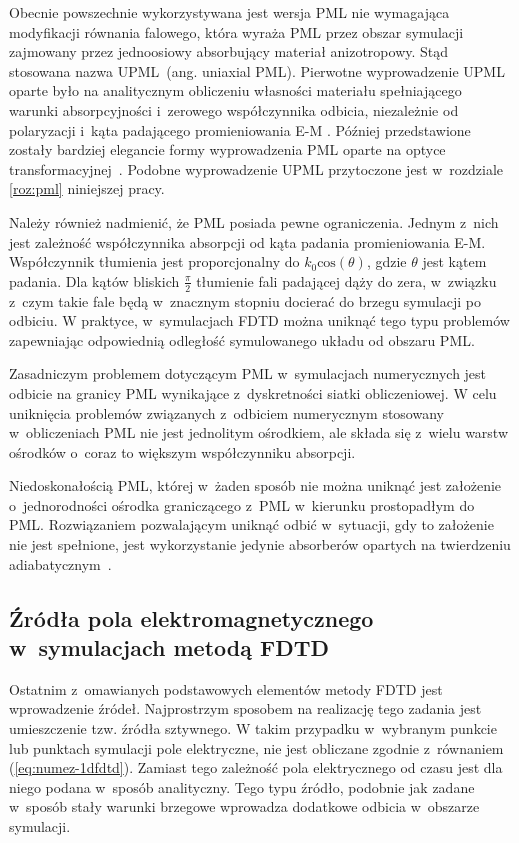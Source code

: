 Obecnie powszechnie wykorzystywana jest wersja PML nie wymagająca modyfikacji równania falowego, która wyraża PML przez obszar symulacji zajmowany przez jednoosiowy absorbujący materiał anizotropowy. Stąd stosowana nazwa UPML~(ang. uniaxial PML). Pierwotne wyprowadzenie UPML oparte było na analitycznym obliczeniu własności materiału spełniającego warunki absorpcyjności i~zerowego współczynnika odbicia, niezależnie od polaryzacji i~kąta padającego promieniowania E-M  \cite{sacks1995perfectly}. Później przedstawione zostały bardziej elegancie formy wyprowadzenia PML oparte na optyce transformacyjnej~\cite{rappaport1995perfectly}. Podobne wyprowadzenie UPML przytoczone jest w~rozdziale \ref{roz:pml} niniejszej pracy.

Należy również nadmienić, że PML posiada pewne ograniczenia. Jednym z~nich jest zależność współczynnika absorpcji od kąta padania promieniowania E-M. Współczynnik tłumienia jest proporcjonalny do $k_0 \textrm{cos}(\theta)$, gdzie $\theta$ jest kątem padania. Dla kątów bliskich $\frac{\pi}{2}$ tłumienie fali padającej dąży do zera, w~związku z~czym takie fale będą w~znacznym stopniu docierać do brzegu symulacji po odbiciu. W praktyce, w~symulacjach FDTD można uniknąć tego typu problemów zapewniając odpowiednią odległość symulowanego układu od obszaru PML.


Zasadniczym problemem dotyczącym PML w~symulacjach numerycznych jest odbicie na granicy PML wynikające z~dyskretności siatki obliczeniowej. W celu uniknięcia problemów związanych z~odbiciem numerycznym stosowany w~obliczeniach PML nie jest jednolitym ośrodkiem, ale składa się z~wielu warstw ośrodków o~coraz to większym współczynniku absorpcji.

Niedoskonałością PML, której w~żaden sposób nie można uniknąć jest założenie o~jednorodności ośrodka graniczącego z~PML w~kierunku prostopadłym do PML. Rozwiązaniem pozwalającym uniknąć odbić w~sytuacji, gdy to założenie nie jest spełnione, jest wykorzystanie jedynie absorberów opartych na twierdzeniu adiabatycznym~\cite{oskooi2008failure}.

\subsection{Źródła pola elektromagnetycznego w~symulacjach metodą FDTD}
Ostatnim z~omawianych podstawowych elementów metody FDTD jest wprowadzenie źródeł. Najprostrzym sposobem na realizację tego zadania jest umieszczenie tzw. źródła sztywnego. W takim przypadku w~wybranym punkcie lub punktach symulacji pole elektryczne, nie jest obliczane zgodnie z~równaniem (\ref{eq:numez-1dfdtd}). Zamiast tego zależność pola elektrycznego od czasu jest dla niego podana w~sposób analityczny. Tego typu źródło, podobnie jak zadane w~sposób stały warunki brzegowe wprowadza dodatkowe odbicia w~obszarze symulacji.

